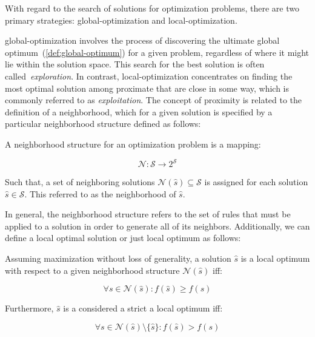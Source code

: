With regard to the search of solutions for optimization problems, there are two
primary strategies: \acrfull{global-optimization} and \acrfull{local-optimization}.

\acrshort{global-optimization} involves the process of discovering the ultimate
global optimum~(\ref{def:global-optimum}) for a given problem, regardless of
where it might lie within the solution space. This search for the best solution
is often called~\textit{exploration}. In contrast,
\acrshort{local-optimization} concentrates on finding the most optimal solution
among proximate that are close in some way, which is commonly referred to as
\textit{exploitation}. The concept of proximity is related to the definition
of a neighborhood, which for a given solution is specified by a particular
neighborhood structure defined as follows:

\begin{definition}
  \label{def:neighborhood-structure}

  A neighborhood structure for an optimization problem is a mapping:

  \begin{equation}
    \label{eq:neighborhood-structure}
    \mathcal{N} \colon \mathcal{S} \longrightarrow 2^{\mathcal{S}}
  \end{equation}

  Such that, a set of neighboring solutions $\mathcal{N}(\hat{s}) \subseteq
    \mathcal{S}$ is assigned for each solution $\hat{s} \in \mathcal{S}$. This
  referred to as the neighborhood of $\hat{s}$.
\end{definition}

In general, the neighborhood structure refers to the set of rules that must be
applied to a solution in order to generate all of its neighbors.  Additionally,
we can define a local optimal solution or just local optimum as follows:

\begin{definition}
  \label{def:local-optimum}

  Assuming maximization without loss of generality, a solution $\hat{s}$ is
  a local optimum with respect to a given neighborhood structure $\mathcal{N}(\hat{s})$ iff:

  \begin{equation}
    \label{eq:local-optimum}
    \forall s \in \mathcal{N}(\hat{s}) \colon f(\hat{s}) \geq f(s)
  \end{equation}

  Furthermore, $\hat{s}$ is a considered a strict a local optimum iff:

  \begin{equation}
    \label{eq:strict-local-optimum}
    \forall s \in \mathcal{N}(\hat{s}) \setminus \{\hat{s}\} \colon f(\hat{s}) > f(s)
  \end{equation}
\end{definition}

